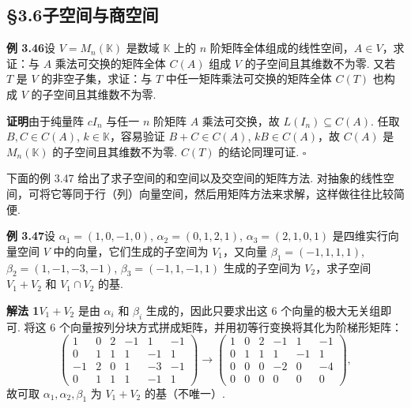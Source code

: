 \documentclass[UTF8,12pt,a4paper,fontset=fandol]{ctexart}
\begin{document}
\subsection*{§3.6\quad 子空间与商空间}

\noindent\textbf{例 3.46}\quad 设 $V=M_n(\mathbb{K})$ 是数域 $\mathbb{K}$ 上的 $n$ 阶矩阵全体组成的线性空间，$A\in V$，求证：与 $A$ 乘法可交换的矩阵全体 $C(A)$ 组成 $V$ 的子空间且其维数不为零. 又若 $T$ 是 $V$ 的非空子集，求证：与 $T$ 中任一矩阵乘法可交换的矩阵全体 $C(T)$ 也构成 $V$ 的子空间且其维数不为零.

\noindent\textbf{证明}\quad 由于纯量阵 $cI_n$ 与任一 $n$ 阶矩阵 $A$ 乘法可交换，故 $L(I_n)\subseteq C(A)$. 任取 $B,C\in C(A)$, $k\in\mathbb{K}$，容易验证 $B+C\in C(A)$, $kB\in C(A)$，故 $C(A)$ 是 $M_n(\mathbb{K})$ 的子空间且其维数不为零. $C(T)$ 的结论同理可证. $\square$

下面的例 3.47 给出了求子空间的和空间以及交空间的矩阵方法. 对抽象的线性空间，可将它等同于行（列）向量空间，然后用矩阵方法来求解，这样做往往比较简便.

\noindent\textbf{例 3.47}\quad 设 $\alpha_1=(1,0,-1,0)$, $\alpha_2=(0,1,2,1)$, $\alpha_3=(2,1,0,1)$ 是四维实行向量空间 $V$ 中的向量，它们生成的子空间为 $V_1$，又向量 $\beta_1=(-1,1,1,1)$, $\beta_2=(1,-1,-3,-1)$, $\beta_3=(-1,1,-1,1)$ 生成的子空间为 $V_2$，求子空间 $V_1+V_2$ 和 $V_1\cap V_2$ 的基.

\noindent\textbf{解法 1}\quad $V_1+V_2$ 是由 $\alpha_i$ 和 $\beta_i$ 生成的，因此只要求出这 6 个向量的极大无关组即可. 将这 6 个向量按列分块方式拼成矩阵，并用初等行变换将其化为阶梯形矩阵：
\[
\begin{pmatrix}
1&0&2&-1&1&-1\\
0&1&1&1&-1&1\\
-1&2&0&1&-3&-1\\
0&1&1&1&-1&1
\end{pmatrix}
\to
\begin{pmatrix}
1&0&2&-1&1&-1\\
0&1&1&1&-1&1\\
0&0&0&-2&0&-4\\
0&0&0&0&0&0
\end{pmatrix},
\]
故可取 $\alpha_1,\alpha_2,\beta_1$ 为 $V_1+V_2$ 的基（不唯一）.
\end{document}

